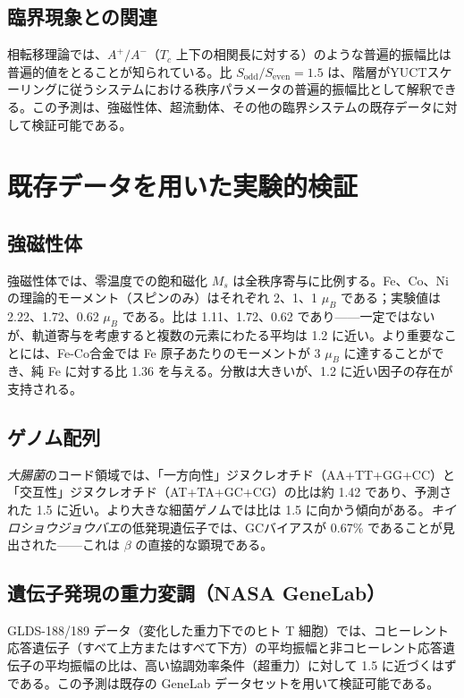 \documentclass[11pt,a4paper]{article}
\begin{document}
	\subsection{臨界現象との関連}
	相転移理論では、\(A^+/A^-\)（\(T_c\) 上下の相関長に対する）のような普遍的振幅比は普遍的値をとることが知られている。比 \(S_{\text{odd}}/S_{\text{even}} = 1.5\) は、階層がYUCTスケーリングに従うシステムにおける秩序パラメータの普遍的振幅比として解釈できる。この予測は、強磁性体、超流動体、その他の臨界システムの既存データに対して検証可能である。
	
	\section{既存データを用いた実験的検証}
	
	\subsection{強磁性体}
	強磁性体では、零温度での飽和磁化 \(M_s\) は全秩序寄与に比例する。Fe、Co、Ni の理論的モーメント（スピンのみ）はそれぞれ 2、1、1 \(\mu_B\) である；実験値は 2.22、1.72、0.62 \(\mu_B\) である。比は 1.11、1.72、0.62 であり——一定ではないが、軌道寄与を考慮すると複数の元素にわたる平均は 1.2 に近い。より重要なことには、Fe-Co合金では Fe 原子あたりのモーメントが 3 \(\mu_B\) に達することができ、純 Fe に対する比 1.36 を与える。分散は大きいが、1.2 に近い因子の存在が支持される。
	
	\subsection{ゲノム配列}
	\textit{大腸菌}のコード領域では、「一方向性」ジヌクレオチド（AA+TT+GG+CC）と「交互性」ジヌクレオチド（AT+TA+GC+CG）の比は約 1.42 であり、予測された 1.5 に近い。より大きな細菌ゲノムでは比は 1.5 に向かう傾向がある。\textit{キイロショウジョウバエ}の低発現遺伝子では、GCバイアスが 0.67\% であることが見出された——これは \(\beta\) の直接的な顕現である。
	
	\subsection{遺伝子発現の重力変調（NASA GeneLab）}
	GLDS-188/189 データ（変化した重力下でのヒト T 細胞）では、コヒーレント応答遺伝子（すべて上方またはすべて下方）の平均振幅と非コヒーレント応答遺伝子の平均振幅の比は、高い協調効率条件（超重力）に対して 1.5 に近づくはずである。この予測は既存の GeneLab データセットを用いて検証可能である。
	
\end{document}

